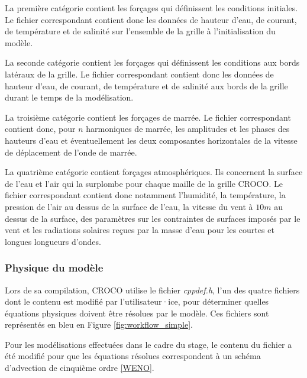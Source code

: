 \documentclass[10pt,a4paper,titlepage]{article}
\begin{document}
La première catégorie contient les forçages qui définissent les conditions initiales.
Le fichier correspondant contient donc les données de hauteur d'eau, de courant, de température et de salinité sur l'ensemble de la grille à l'initialisation du modèle.

La seconde catégorie contient les forçages qui définissent les conditions aux bords latéraux de la grille.
Le fichier correspondant contient donc les données de hauteur d'eau, de courant, de température et de salinité aux bords de la grille durant le temps de la modélisation.

La troisième catégorie contient les forçages de marrée.
Le fichier correspondant contient donc, pour $n$ harmoniques de marrée, les amplitudes et les phases des hauteurs d'eau et éventuellement les deux composantes horizontales de la vitesse de déplacement de l'onde de marrée.

La quatrième catégorie contient forçages atmosphériques.
Ils concernent la surface de l'eau et l'air qui la surplombe pour chaque maille de la grille CROCO.
Le fichier correspondant contient donc notamment l'humidité, la température, la pression de l'air au dessus de la surface de l'eau, la vitesse du vent à $10m$ au dessus de la surface, des paramètres sur les contraintes de surfaces imposés par le vent et les radiations solaires reçues par la masse d'eau pour les courtes et longues longueurs d'ondes.

\subsubsection{Physique du modèle}
\label{subsub:pysique_modele}
Lors de sa compilation, CROCO utilise le fichier \textit{cppdef.h}, l'un des quatre fichiers dont le contenu est modifié par l'utilisateur·ice, pour déterminer quelles équations physiques doivent être résolues par le modèle.
Ces fichiers sont représentés en bleu en Figure \ref{fig:workflow_simple}.

Pour les modélisations effectuées dans le cadre du stage, le contenu du fichier a été modifié pour que les équations résolues correspondent à un schéma d'advection de cinquième ordre \ref{WENO}.
\end{document}
